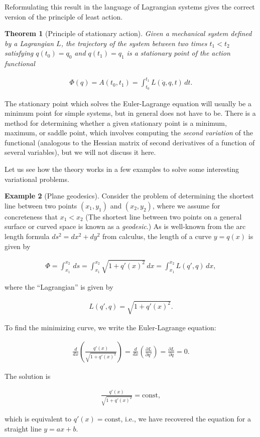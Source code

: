 \documentclass[11pt]{report}
\theoremstyle{plain}
\newtheorem{thm}{Theorem}[chapter]
\theoremstyle{definition}
\newtheorem{example}[thm]{Example}
\begin{document}
\noindent Reformulating this result in the language of
Lagrangian systems gives the correct version of the
principle of least action.

\begin{thm}[Principle of stationary action]
Given a mechanical system defined by a Lagrangian $L$,
the trajectory of the system between two times
$t_1<t_2$ satisfying $q(t_0)=q_0$ and $q(t_1)=q_1$ is
a stationary point of the action functional

\begin{align*}
\Phi(q) = A(t_0,t_1) = \int_{t_0}^{t_1} L(\dot{q},q,t)\,dt.
\end{align*}

\end{thm}

\noindent The stationary point which solves the Euler-Lagrange
equation will usually be a minimum point for simple
systems, but in general does not have to be. There is
a method for determining whether a given stationary
point is a minimum, maximum, or saddle point, which
involves computing the \emph{second variation} of the
functional (analogous to the Hessian matrix of second
derivatives of a function of several variables), but
we will not discuss it here.

Let us see how the theory works in a few examples to
solve some interesting variational problems.

\begin{example}[Plane geodesics]
Consider the problem of determining the shortest line
between two points $(x_1,y_1)$ and $(x_2,y_2)$, where
we assume for concreteness that $x_1<x_2$ (The
shortest line between two points on a general surface
or curved space is known as a \emph{geodesic}.) As is
well-known from the arc length formula
$ds^2=dx^2+dy^2$ from calculus, the length of a curve
$y=q(x)$ is given by

\begin{align*}
\Phi = \int_{x_1}^{x_2} \,ds = \int_{x_1}^{x_2} \sqrt{1+q'(x)^2}\,dx
= \int_{x_1}^{x_2} L(q',q)\,dx,
\end{align*}

\noindent where the ``Lagrangian'' is given by

\begin{align*}
L(q',q) = \sqrt{1+q'(x)^2}.
\end{align*}

\noindent To find the minimizing curve, we write the
Euler-Lagrange equation:

\begin{align*}
\frac{d}{dx} \left(\frac{q'(x)}{\sqrt{1+q'(x)^2}}\right) = \frac{d}{dx}\left( \frac{\partial L}{\partial q'} \right) = \frac{\partial L}{\partial q} = 0.
\end{align*}

\noindent The solution is

\begin{align*}
\frac{q'(x)}{\sqrt{1+q'(x)^2}} = \textrm{const},
\end{align*}

\noindent which is equivalent to $q'(x)=\textrm{const}$, i.e.,
we have recovered the equation for a straight line
$y=ax+b$.
\end{example}
\end{document}
